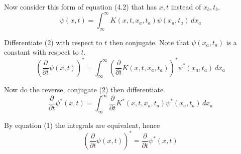 Now consider this form of equation (4.2) that has $x,t$ instead of $x_b,t_b$.
\begin{equation*}
\psi(x,t)=\int_{\infty}^\infty K(x,t,x_a,t_a)\psi(x_a,t_a)\,dx_a
\tag{2}
\end{equation*}

Differentiate (2) with respect to $t$ then conjugate.
Note that $\psi(x_a,t_a)$ is a constant with respect to $t$.
\begin{equation*}
\left(\frac{\partial}{\partial t}\psi(x,t)\right)^*
=\int_{\infty}^\infty\left(\frac{\partial}{\partial t}K(x,t,x_a,t_a)\right)^*\psi^*(x_a,t_a)\,dx_a
\end{equation*}

Now do the reverse, conjugate (2) then differentiate.
\begin{equation*}
\frac{\partial}{\partial t}\psi^*(x,t)
=\int_{\infty}^\infty\frac{\partial}{\partial t}K^*(x,t,x_a,t_a)\psi^*(x_a,t_a)\,dx_a
\end{equation*}

By equation (1) the integrals are equivalent, hence
\begin{equation*}
\left(\frac{\partial}{\partial t}\psi(x,t)\right)^*=\frac{\partial}{\partial t}\psi^*(x,t)
\end{equation*}


